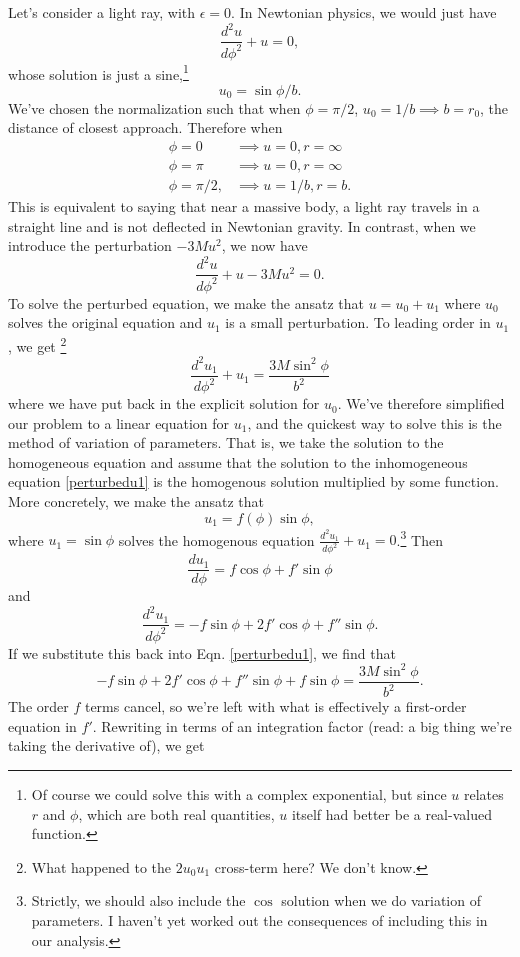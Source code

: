 Let's consider a light ray, with $\epsilon=0$. In Newtonian physics, we would just have
$$\frac{d^2u}{d\phi^2}+u=0,$$ whose solution is just a sine,\footnote{Of course we could solve this with a complex exponential, but since $u$ relates $r$ and $\phi$, which are both real quantities, $u$ itself had better be a real-valued function.} $$u_0=\sin\phi/b.$$ We've chosen the normalization such that when $\phi=\pi/2$, $u_0=1/b\implies b=r_0$, the distance of closest approach. Therefore when
\begin{align*}
    \phi=0 &\implies u=0,r=\infty\\
    \phi=\pi &\implies u=0, r=\infty\\
    \phi=\pi/2, &\implies u=1/b, r=b.
\end{align*}
This is equivalent to saying that near a massive body, a light ray travels in a straight line and is not deflected in Newtonian gravity. In contrast, when we introduce the perturbation $-3Mu^2$, we now have
\begin{equation}
\frac{d^2u}{d\phi^2}+u-3Mu^2=0.
\end{equation}
To solve the perturbed equation, we make the ansatz that $u=u_0+u_1$ where $u_0$ solves the original equation and $u_1$ is a small perturbation. To leading order in $u_1$, we get%
    \footnote{What happened to the $2u_0u_1$ cross-term here? We don't know.}
\begin{equation}\label{perturbedu1}
    \frac{d^2u_1}{d\phi^2}+u_1=\frac{3M\sin^2\phi}{b^2}
\end{equation}
where we have put back in the explicit solution for $u_0$.
We've therefore simplified our problem to a linear equation for $u_1$, and the quickest way to solve this is the method of variation of parameters. That is, we take the solution to the homogeneous equation and assume that the solution to the inhomogeneous equation \eqref{perturbedu1} is the homogenous solution multiplied by some function. More concretely, we make the ansatz that $$u_1=f(\phi)\sin\phi,$$ where $u_1=\sin\phi$ solves the homogenous equation $\frac{d^2u_1}{d\phi^2}+u_1=0$.\footnote{Strictly, we should also include the $\cos$ solution when we do variation of parameters. I haven't yet worked out the consequences of including this in our analysis.} Then
$$\frac{du_1}{d\phi}=f\cos\phi+f' \sin\phi$$
and
$$\frac{d^2u_1}{d\phi^2}=-f\sin\phi+2f' \cos\phi+f''\sin\phi.$$
If we substitute this back into Eqn. \eqref{perturbedu1}, we find that
$$-f\sin\phi+2f'\cos\phi+f''\sin\phi+f\sin\phi=\frac{3M\sin^2\phi}{b^2}.$$
The order $f$ terms cancel, so we're left with what is effectively a first-order equation in $f'$. Rewriting in terms of an integration factor (read: a big thing we're taking the derivative of), we get
